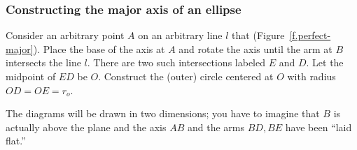 


\subsubsection*{Constructing the major axis of an ellipse}

Consider an arbitrary point $A$ on an arbitrary line $l$ that (Figure~\ref{f.perfect-major}). Place the base of the axis at $A$ and rotate the axis until the arm at $B$ intersects the line $l$. There are two such intersections labeled $E$ and $D$. Let the midpoint of $ED$ be $O$. Construct the (outer) circle centered at $O$ with radius $OD=OE=r_o$.

The diagrams will be drawn in two dimensions; you have to imagine that $B$ is actually above the plane and the axis $AB$ and the arms $BD, BE$ have been ``laid flat.''


